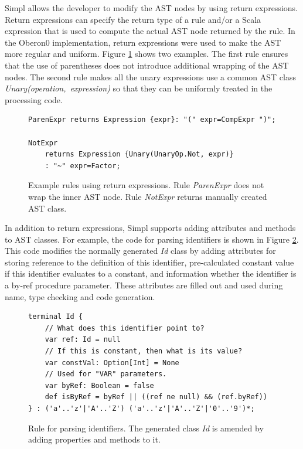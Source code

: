 Simpl allows the developer to modify the AST nodes by using return
expressions. Return expressions can specify the return type of a rule
and/or a Scala expression that is used to compute the actual AST node
returned by the rule. In the Oberon0 implementation, return expressions
were used to make the AST more regular and uniform. Figure \ref{fig:Using-return-expressions}
shows two examples. The first rule ensures that the use of parentheses
does not introduce additional wrapping of the AST nodes. The second
rule makes all the unary expressions use a common AST class \emph{Unary(operation,~expression)}
so that they can be uniformly treated in the processing code. 

\begin{figure}[!h]
{\small }
\begin{lstlisting}[basicstyle={\footnotesize\ttfamily}]
ParenExpr returns Expression {expr}: "(" expr=CompExpr ")";

NotExpr
    returns Expression {Unary(UnaryOp.Not, expr)}
    : "~" expr=Factor;
\end{lstlisting}
{\small \par}

\caption{\label{fig:Using-return-expressions}Example rules using return expressions.
Rule \emph{ParenExpr} does not wrap the inner AST node. Rule \emph{NotExpr}
returns manually created AST class.}
\end{figure}






In addition to return expressions, Simpl supports adding attributes
and methods to AST classes. For example, the code for parsing identifiers
is shown in Figure \ref{fig:Adding-properties}. This code modifies
the normally generated \emph{Id} class by adding attributes for storing
reference to the definition of this identifier, pre-calculated constant
value if this identifier evaluates to a constant, and information
whether the identifier is a by-ref procedure parameter. These attributes
are filled out and used during name, type checking and code generation.

\begin{figure}[!h]
{\small }
\begin{lstlisting}[basicstyle={\footnotesize\ttfamily}]
terminal Id {
    // What does this identifier point to?
    var ref: Id = null
    // If this is constant, then what is its value?
    var constVal: Option[Int] = None
    // Used for "VAR" parameters.
    var byRef: Boolean = false
    def isByRef = byRef || ((ref ne null) && (ref.byRef))
} : ('a'..'z'|'A'..'Z') ('a'..'z'|'A'..'Z'|'0'..'9')*;
\end{lstlisting}
{\small \par}

\caption{\label{fig:Adding-properties}Rule for parsing identifiers. The generated
class \emph{Id} is amended by adding properties and methods to it.}
\end{figure}




